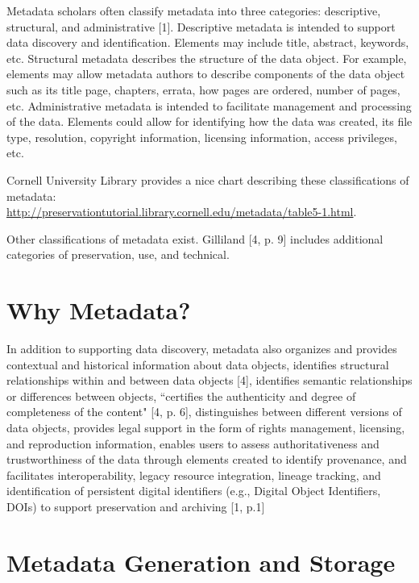 \documentclass[10pt,oneside]{memoir}
\begin{document}
Metadata scholars often classify metadata into three categories: descriptive, structural, and administrative [1].
Descriptive metadata is intended to support data discovery and identification. Elements may include title, abstract, keywords, etc.
Structural metadata describes the structure of the data object. For example, elements may allow metadata authors to describe components of the data object such as its title page, chapters, errata, how pages are ordered, number of pages, etc.
Administrative metadata is intended to facilitate management and processing of the data.
Elements could allow for identifying how the data was created, its file type, resolution, copyright information, licensing information, access privileges, etc.

Cornell University Library provides a nice chart describing these classifications of metadata: \\ \url{http://preservationtutorial.library.cornell.edu/metadata/table5-1.html}.

Other classifications of metadata exist. Gilliland [4, p. 9] includes additional categories of preservation, use, and technical.

\section{Why Metadata?}

In addition to supporting data discovery, metadata also organizes and provides contextual and historical information about data objects, identifies structural relationships within and between data objects [4], identifies semantic relationships or differences between objects, ``certifies the authenticity and degree of completeness of the content" [4, p. 6], distinguishes between different versions of data objects, provides legal support in the form of rights management, licensing, and reproduction information, enables users to assess authoritativeness and trustworthiness of the data through elements created to identify provenance, and facilitates interoperability, legacy resource integration, lineage tracking, and identification of persistent digital identifiers (e.g., Digital Object Identifiers, DOIs) to support preservation and archiving [1, p.1]

\section{Metadata Generation and Storage}
\end{document}
